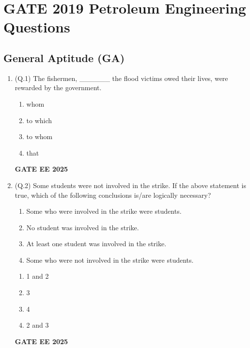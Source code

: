 \documentclass{article}
\begin{document}
\section*{GATE 2019 Petroleum Engineering Questions}

\subsection*{General Aptitude (GA)}

\begin{enumerate}[leftmargin=*,label=\textbf{Q.\arabic*},start=1]
    \item (Q.1) The fishermen, \_\_\_\_\_\_ the flood victims owed their lives, were rewarded by the government.
    \begin{multicols}{4}
    \begin{enumerate}[label=(\Alph*)]
        \item whom
        \item to which
        \item to whom
        \item that
    \end{enumerate}
    \end{multicols}
    \textbf{GATE EE 2025}

    \item (Q.2) Some students were not involved in the strike. If the above statement is true, which of the following conclusions is/are logically necessary?
    \begin{enumerate}[label=\arabic*.]
        \item Some who were involved in the strike were students.
        \item No student was involved in the strike.
        \item At least one student was involved in the strike.
        \item Some who were not involved in the strike were students.
    \end{enumerate}
    \begin{multicols}{4}
    \begin{enumerate}[label=(\Alph*)]
        \item 1 and 2
        \item 3
        \item 4
        \item 2 and 3
    \end{enumerate}
    \end{multicols}
    \textbf{GATE EE 2025}


\end{enumerate}
\end{document}
